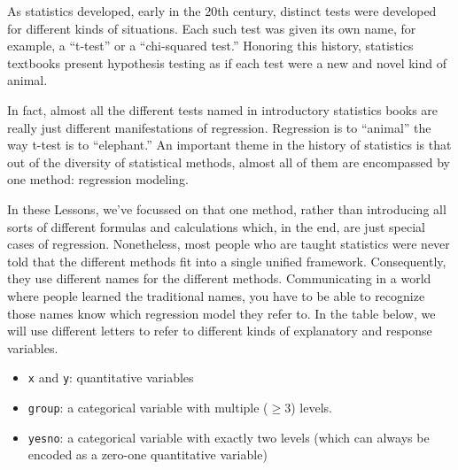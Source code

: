 \documentclass[
  letterpaper,
  DIV=11,
  numbers=noendperiod,
  oneside]{scrreprt}
\begin{document}
As statistics developed, early in the 20th century, distinct tests were
developed for different kinds of situations. Each such test was given
its own name, for example, a ``t-test'' or a ``chi-squared test.''
Honoring this history, statistics textbooks present hypothesis testing
as if each test were a new and novel kind of animal.

In fact, almost all the different tests named in introductory statistics
books are really just different manifestations of regression. Regression
is to ``animal'' the way t-test is to ``elephant.'' An important theme
in the history of statistics is that out of the diversity of statistical
methods, almost all of them are encompassed by one method: regression
modeling.

In these Lessons, we've focussed on that one method, rather than
introducing all sorts of different formulas and calculations which, in
the end, are just special cases of regression. Nonetheless, most people
who are taught statistics were never told that the different methods fit
into a single unified framework. Consequently, they use different names
for the different methods. Communicating in a world where people learned
the traditional names, you have to be able to recognize those names know
which regression model they refer to. In the table below, we will use
different letters to refer to different kinds of explanatory and
response variables.

\begin{itemize}
\item
  \texttt{x} and \texttt{y}: quantitative variables
\item
  \texttt{group}: a categorical variable with multiple (\(\geq 3\))
  levels.
\item
  \texttt{yesno}: a categorical variable with exactly two levels (which
  can always be encoded as a zero-one quantitative variable)
\end{itemize}
\end{document}
